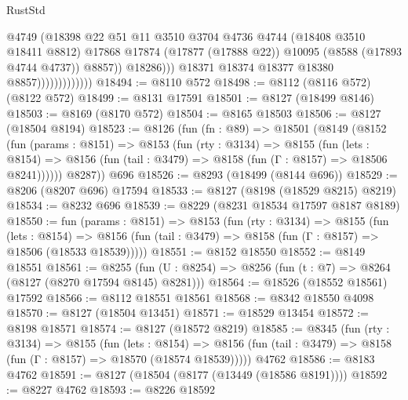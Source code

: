 \begin{lexlean}{RustStd}
\begin{coremodule}
                                      @4749
                                      (@18398
                                        @22
                                        @51
                                        @11
                                        @3510
                                        @3704
                                        @4736
                                        @4744
                                        (@18408 @3510 @18411 @8812)
                                        @17868
                                        @17874
                                        (@17877 (@17888 @22))
                                        @10095
                                        (@8588 (@17893 @4744 @4737))
                                        @8857))
                                    @18286)))
                              @18371
                              @18374
                              @18377
                              @18380
                              @8857)))))))))))))
@18494 := @8110 @572
@18498 := @8112 (@8116 @572) (@8122 @572)
@18499 := @8131 @17591
@18501 := @8127 (@18499 @8146)
@18503 := @8169 (@8170 @572)
@18504 := @8165 @18503
@18506 := @8127 (@18504 @8194)
@18523 := @8126
    (fun (fn : @89) =>
    @18501
      (@8149
        (@8152
          (fun (params : @8151) =>
          @8153
            (fun (rty : @3134) =>
            @8155
              (fun (lets : @8154) =>
              @8156 (fun (tail : @3479) => @8158 (fun (Γ : @8157) => @18506 @8241))))))
        @8287))
    @696
@18526 := @8293 (@18499 (@8144 @696))
@18529 := @8206 (@8207 @696) @17594
@18533 := @8127 (@8198 (@18529 @8215) @8219)
@18534 := @8232 @696
@18539 := @8229 (@8231 @18534 @17597 @8187 @8189)
@18550 := fun (params : @8151) =>
  @8153
    (fun (rty : @3134) =>
    @8155
      (fun (lets : @8154) =>
      @8156 (fun (tail : @3479) => @8158 (fun (Γ : @8157) => @18506 (@18533 @18539)))))
@18551 := @8152 @18550
@18552 := @8149 @18551
@18561 := @8255
    (fun (U : @8254) => @8256 (fun (t : @7) => @8264 (@8127 (@8270 @17594 @8145) @8281)))
@18564 := @18526 (@18552 @18561) @17592
@18566 := @8112 @18551 @18561
@18568 := @8342 @18550 @4098
@18570 := @8127 (@18504 @13451)
@18571 := @18529 @13454
@18572 := @8198 @18571
@18574 := @8127 (@18572 @8219)
@18585 := @8345
    (fun (rty : @3134) =>
    @8155
      (fun (lets : @8154) =>
      @8156 (fun (tail : @3479) => @8158 (fun (Γ : @8157) => @18570 (@18574 @18539)))))
    @4762
@18586 := @8183 @4762
@18591 := @8127 (@18504 (@8177 (@13449 (@18586 @8191))))
@18592 := @8227 @4762
@18593 := @8226 @18592

\end{coremodule}
\end{lexlean}
